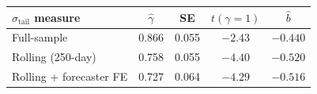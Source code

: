 \begin{tabular}{l cccc}
\toprule
$\sigma_{\mathrm{tail}}$ measure & $\hat{\gamma}$ & SE & $t(\gamma=1)$ & $\hat{b}$ \\
\midrule
Full-sample & 0.866 & 0.055 & $-2.43$ & $-0.440$ \\
Rolling (250-day) & 0.758 & 0.055 & $-4.40$ & $-0.520$ \\
Rolling + forecaster FE & 0.727 & 0.064 & $-4.29$ & $-0.516$ \\
\bottomrule
\end{tabular}
